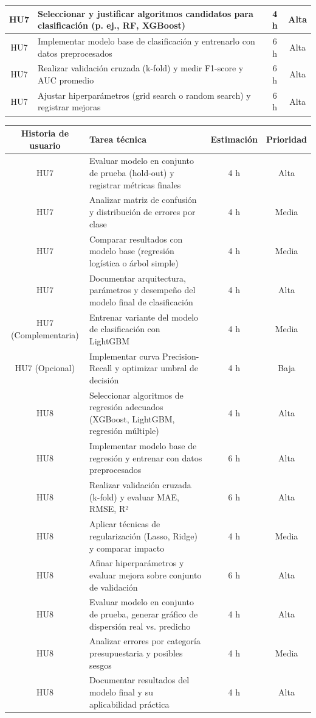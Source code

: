 \documentclass[
11pt, %
]{charter}
\begin{document}
\begin{table}[htpb]
\begin{tabularx}{\linewidth}{@{}|c|X|c|c|@{}}
HU7 & Seleccionar y justificar algoritmos candidatos para clasificación (p. ej., RF, XGBoost) & 4 h & Alta \\ \hline
HU7 & Implementar modelo base de clasificación y entrenarlo con datos preprocesados & 6 h & Alta \\ \hline
HU7 & Realizar validación cruzada (k-fold) y medir F1-score y AUC promedio & 6 h & Alta \\ \hline
HU7 & Ajustar hiperparámetros (grid search o random search) y registrar mejoras & 6 h & Alta \\ \hline


\end{tabularx}
\end{table}

\begin{table}[htpb]
\centering
\begin{tabularx}{\linewidth}{@{}|c|X|c|c|@{}}
\hline
\rowcolor[HTML]{C0C0C0}
Historia de usuario & Tarea técnica & Estimación & Prioridad \\ \hline

HU7 & Evaluar modelo en conjunto de prueba (hold-out) y registrar métricas finales & 4 h & Alta \\ \hline
HU7 & Analizar matriz de confusión y distribución de errores por clase & 4 h & Media \\ \hline
HU7 & Comparar resultados con modelo base (regresión logística o árbol simple) & 4 h & Media \\ \hline
HU7 & Documentar arquitectura, parámetros y desempeño del modelo final de clasificación & 4 h & Alta \\ \hline
HU7 (Complementaria) & Entrenar variante del modelo de clasificación con LightGBM & 4 h & Media \\ \hline
HU7 (Opcional) & Implementar curva Precision-Recall y optimizar umbral de decisión & 4 h & Baja \\ \hline

HU8 & Seleccionar algoritmos de regresión adecuados (XGBoost, LightGBM, regresión múltiple) & 4 h & Alta \\ \hline
HU8 & Implementar modelo base de regresión y entrenar con datos preprocesados & 6 h & Alta \\ \hline
HU8 & Realizar validación cruzada (k-fold) y evaluar MAE, RMSE, R² & 6 h & Alta \\ \hline
HU8 & Aplicar técnicas de regularización (Lasso, Ridge) y comparar impacto & 4 h & Media \\ \hline
HU8 & Afinar hiperparámetros y evaluar mejora sobre conjunto de validación & 6 h & Alta \\ \hline
HU8 & Evaluar modelo en conjunto de prueba, generar gráfico de dispersión real vs. predicho & 4 h & Alta \\ \hline
HU8 & Analizar errores por categoría presupuestaria y posibles sesgos & 4 h & Media \\ \hline
HU8 & Documentar resultados del modelo final y su aplicabilidad práctica & 4 h & Alta \\ \hline



\end{tabularx}
\end{table}
\end{document}

